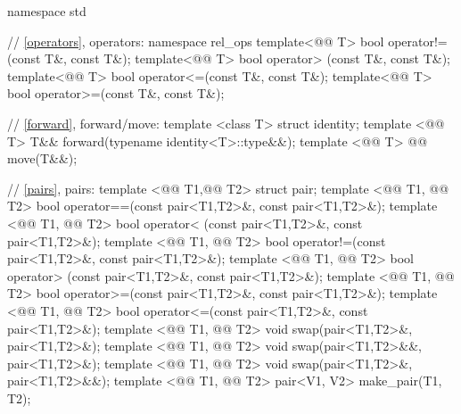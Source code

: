 \documentclass[american,twoside]{book}
\begin{document}
\begin{codeblock}
namespace std {
  // \ref{operators}, operators:
  namespace rel_ops {
    template<@@ T> bool operator!=(const T&, const T&);
    template<@@ T> bool operator> (const T&, const T&);
    template<@@ T> bool operator<=(const T&, const T&);
    template<@@ T> bool operator>=(const T&, const T&);
  }

  // \ref{forward}, forward/move:
  template <class T> struct identity;
  template <@@ T> T&& forward(typename identity<T>::type&&);
  template <@@ T> @@ move(T&&);

  // \ref{pairs}, pairs:
  template <@@ T1,@@ T2> struct pair;
  template <@@ T1, @@ T2>
    bool operator==(const pair<T1,T2>&, const pair<T1,T2>&);
  template <@@ T1, @@ T2>
    bool operator< (const pair<T1,T2>&, const pair<T1,T2>&);
  template <@@ T1, @@ T2>
    bool operator!=(const pair<T1,T2>&, const pair<T1,T2>&);
  template <@@ T1, @@ T2>
    bool operator> (const pair<T1,T2>&, const pair<T1,T2>&);
  template <@@ T1, @@ T2>
    bool operator>=(const pair<T1,T2>&, const pair<T1,T2>&);
  template <@@ T1, @@ T2>
    bool operator<=(const pair<T1,T2>&, const pair<T1,T2>&);
  template <@@ T1, @@ T2> 
    void swap(pair<T1,T2>&, pair<T1,T2>&); 
  template <@@ T1, @@ T2> 
    void swap(pair<T1,T2>&&, pair<T1,T2>&);
  template <@@ T1, @@ T2> 
    void swap(pair<T1,T2>&, pair<T1,T2>&&); 
  template <@@ T1,
  @@ T2> pair<V1, V2> make_pair(T1, T2);

}
\end{codeblock}
\end{document}
